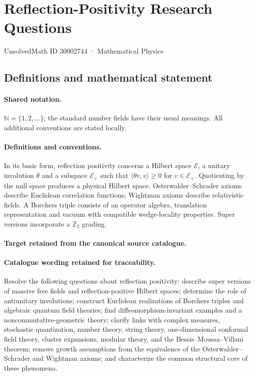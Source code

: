 \documentclass[11pt]{article}
\begin{document}
\setcounter{section}{30002743}
\section{Reflection-Positivity Research Questions}\label{30002744}
{\small UnsolvedMath ID 30002744 · Mathematical Physics}
\subsection{Definitions and mathematical statement}

\paragraph{Shared notation.}$\mathbb N=\{1,2,\ldots\}$; the standard number fields have their usual meanings. All additional conventions are stated locally.


\paragraph{Definitions and conventions.}
In its basic form, reflection positivity concerns a Hilbert space $\mathcal E$, a unitary involution $\theta$ and a subspace $\mathcal E_+$ such that $\langle\theta v,v\rangle\geq0$ for $v\in\mathcal E_+$. Quotienting by the null space produces a physical Hilbert space. Osterwalder--Schrader axioms describe Euclidean correlation functions; Wightman axioms describe relativistic fields. A Borchers triple consists of an operator algebra, translation representation and vacuum with compatible wedge-locality properties. Super versions incorporate a $\mathbb Z_2$ grading.

\paragraph{Target retained from the canonical source catalogue.}
\paragraph{Catalogue wording retained for traceability.}
Resolve the following questions about reflection positivity: describe super versions of massive free fields and reflection-positive Hilbert spaces; determine the role of antiunitary involutions; construct Euclidean realizations of Borchers triples and algebraic quantum field theories; find diffeomorphism-invariant examples and a noncommutative-geometric theory; clarify links with complex measures, stochastic quantization, number theory, string theory, one-dimensional conformal field theory, cluster expansions, modular theory, and the Bessis–Moussa–Villani theorem; remove growth assumptions from the equivalence of the Osterwalder–Schrader and Wightman axioms; and characterize the common structural core of these phenomena.
\end{document}
